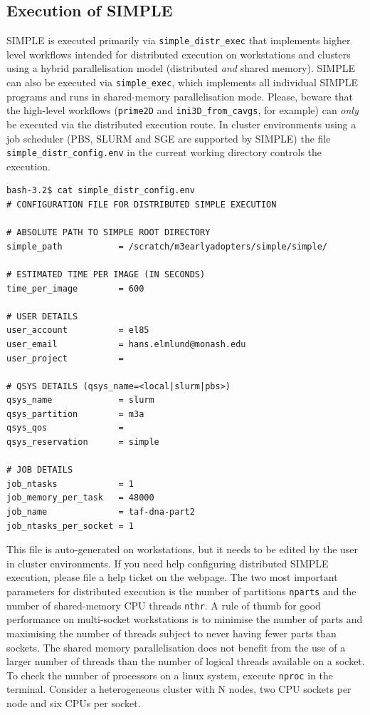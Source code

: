\documentclass[a4paper,11pt]{article}
\newcommand{\prgname}[1]{\textcolor{NavyBlue}{\texttt{#1}}}
\begin{document}
\subsection{Execution of SIMPLE}
SIMPLE is executed primarily via \texttt{simple\_distr\_exec} that implements higher level workflows intended for distributed execution on workstations and clusters using a hybrid parallelisation model (distributed \textit{and} shared memory). SIMPLE can also be executed via \texttt{simple\_exec}, which implements all individual SIMPLE programs and runs in shared-memory parallelisation mode. Please, beware that the high-level workflows (\prgname{prime2D} and \prgname{ini3D\_from\_cavgs}, for example) can \textit{only} be executed via the distributed execution route. In cluster environments using a job scheduler (PBS, SLURM and SGE are supported by SIMPLE) the file \texttt{simple\_distr\_config.env} in the current working directory controls the execution.
\begin{verbatim}
bash-3.2$ cat simple_distr_config.env 
# CONFIGURATION FILE FOR DISTRIBUTED SIMPLE EXECUTION

# ABSOLUTE PATH TO SIMPLE ROOT DIRECTORY
simple_path           = /scratch/m3earlyadopters/simple/simple/

# ESTIMATED TIME PER IMAGE (IN SECONDS)
time_per_image        = 600

# USER DETAILS
user_account          = el85 
user_email            = hans.elmlund@monash.edu
user_project          = 

# QSYS DETAILS (qsys_name=<local|slurm|pbs>)
qsys_name             = slurm
qsys_partition        = m3a
qsys_qos              =
qsys_reservation      = simple

# JOB DETAILS
job_ntasks            = 1
job_memory_per_task   = 48000
job_name              = taf-dna-part2
job_ntasks_per_socket = 1
\end{verbatim}
This file is auto-generated on workstations, but it needs to be edited by the user in cluster environments. If you need help configuring distributed SIMPLE execution, please file a help ticket on the webpage. The two most important parameters for distributed execution is the number of partitions \texttt{nparts} and the number of shared-memory CPU threads \texttt{nthr}. A rule of thumb for good performance on multi-socket workstations is to minimise the number of parts and maximising the number of threads subject to never having fewer parts than sockets. The shared memory parallelisation does not benefit from the use of a larger number of threads than the number of logical threads available on a socket. To check the number of processors on a linux system, execute \texttt{nproc} in the terminal. Consider a heterogeneous cluster with N nodes, two CPU sockets per node and six CPUs per socket.
\end{document}
